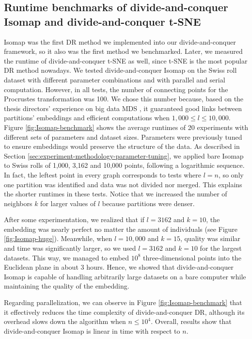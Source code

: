 \subsection{Runtime benchmarks of divide-and-conquer Isomap and divide-and-conquer t-SNE}
\label{sec:initial-runtime-benchmarks}

Isomap was the first DR method we implemented into our divide-and-conquer framework, so it also was the first method we benchmarked. Later, we measured the runtime of divide-and-conquer t-SNE as well, since t-SNE is the most popular DR method nowadays. We tested divide-and-conquer Isomap on the Swiss roll dataset with different parameter combinations and with parallel and serial computation. However, in all tests, the number of connecting points for the Procrustes transformation was 100. We chose this number because, based on the thesis directors' experience on big data MDS \citep{Delicado2024}, it guaranteed good links between partitions' embeddings and efficient computations when $1,000 \leq l \leq 10,000$. Figure \ref{fig:Isomap-benchmark} shows the average runtimes of 20 experiments with different sets of parameters and dataset sizes. Parameters were previously tuned to ensure embeddings would preserve the structure of the data. As described in Section \ref{sec:experiment-methodology-parameter-tuning}, we applied bare Isomap to Swiss rolls of 1,000, 3,162 and 10,000 points, following a logarithmic sequence. In fact, the leftest point in every graph corresponds to tests where $l=n$, so only one partition was identified and data was not divided nor merged. This explains the shorter runtimes in these tests. Notice that we increased the number of neighbors $k$ for larger values of $l$ because partitions were denser.

After some experimentation, we realized that if $l=3162$ and $k=10$, the embedding was nearly perfect no matter the amount of individuals (see Figure \ref{fig:Isomap-huge}). Meanwhile, when $l=10,000$ and $k=15$, quality was similar and time was significantly larger, so we used $l=3162$ and $k=10$ for the largest datasets. This way, we managed to embed $10^8$ three-dimensional points into the Euclidean plane in about 3 hours. Hence, we showed that divide-and-conquer Isomap is capable of handling arbitrarily large datasets on a bare computer while maintaining the quality of the embedding.

Regarding parallelization, we can observe in Figure \ref{fig:Isomap-benchmark} that it effectively reduces the time complexity of divide-and-conquer DR, although its overhead slows down the algorithm when $n \leq 10^4$. Overall, results show that divide-and-conquer Isomap is linear in time with respect to $n$.


